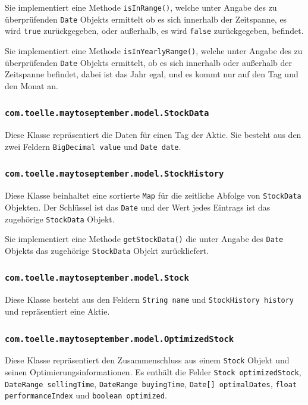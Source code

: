 \documentclass[12pt, a4paper, titlepage]{report}
\begin{document}
        		Sie implementiert eine Methode \texttt{isInRange()}, welche unter Angabe
        		des zu überprüfenden \texttt{Date} Objekts ermittelt ob es sich innerhalb
        		der Zeitspanne, es wird \texttt{true} zurückgegeben, oder außerhalb, es
        		wird \texttt{false} zurückgegeben, befindet.
        		
        		Sie implementiert eine Methode \texttt{isInYearlyRange()}, welche unter
        		Angabe des zu überprüfenden \texttt{Date} Objekts ermittelt, ob es sich
        		innerhalb oder außerhalb der Zeitspanne befindet, dabei ist das Jahr egal,
        		und es kommt nur auf den Tag und den Monat an.
        		
        		\subsubsection{\texttt{com.toelle.maytoseptember.model.StockData}}
        		Diese Klasse repräsentiert die Daten für einen Tag der Aktie. Sie besteht
        		aus den zwei Feldern \texttt{BigDecimal value} und \texttt{Date date}.
        		
        		\subsubsection{\texttt{com.toelle.maytoseptember.model.StockHistory}}
        		Diese Klasse beinhaltet eine sortierte \texttt{Map} für die
        		zeitliche Abfolge von \texttt{StockData} Objekten. Der Schlüssel
        		ist das \texttt{Date} und der Wert jedes Eintrags ist das zugehörige
        		\texttt{StockData} Objekt.
        		
        		Sie implementiert eine Methode \texttt{getStockData()} die unter
        		Angabe des \texttt{Date} Objekts das zugehörige \texttt{StockData}
        		Objekt zurückliefert.
        		
        		\subsubsection{\texttt{com.toelle.maytoseptember.model.Stock}}
        		Diese Klasse besteht aus den Feldern \texttt{String name} und
        		\texttt{StockHistory history} und repräsentiert eine Aktie.
        		
        		\subsubsection{\texttt{com.toelle.maytoseptember.model.OptimizedStock}}
        		Diese Klasse repräsentiert den Zusammenschluss aus einem \texttt{Stock}
        		Objekt und seinen Optimierungsinformationen. Es enthält die Felder
        		\texttt{Stock optimizedStock}, \texttt{DateRange sellingTime},
        		\texttt{DateRange buyingTime}, \texttt{Date[] optimalDates}, 
        		\texttt{float performanceIndex} und \texttt{boolean optimized}.
        		
\end{document}
